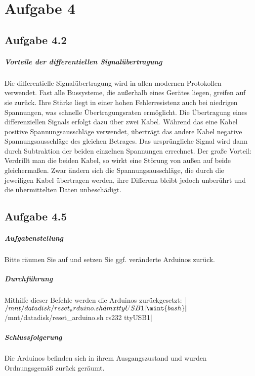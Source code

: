 \chapter{Aufgabe 4}
\section{Aufgabe 4.2}
\paragraph{Vorteile der differentiellen Signalübertragung}
Die differentielle Signalübertragung wird in allen modernen Protokollen verwendet. Fast alle Bussysteme, die außerhalb eines Gerätes liegen, greifen auf sie zurück. Ihre Stärke liegt in einer hohen Fehlerresistenz auch bei niedrigen Spannungen, was schnelle Übertragungsraten ermöglicht. Die Übertragung eines differenziellen Signals erfolgt dazu über zwei Kabel. Während das eine Kabel positive Spannungsausschläge verwendet, überträgt das andere Kabel negative Spannungsausschläge des gleichen Betrages. Das ursprüngliche Signal wird dann durch Subtraktion der beiden einzelnen Spannungen errechnet. Der große Vorteil: Verdrillt man die beiden Kabel, so wirkt eine Störung von außen auf beide gleichermaßen. Zwar ändern sich die Spannungsausschläge, die durch die jeweiligen Kabel übertragen werden, ihre Differenz bleibt jedoch unberührt und die übermittelten Daten unbeschädigt.




\section{Aufgabe 4.5}
\paragraph{Aufgabenstellung}
Bitte räumen Sie auf und setzen Sie ggf. veränderte Arduinos zurück.

\paragraph{Durchführung}
Mithilfe dieser Befehle werden die Arduinos zurückgesetzt:
|$ /mnt/datadisk/reset_arduino.sh dmx ttyUSB1|
\mint{bash}|$ /mnt/datadisk/reset_arduino.sh rs232 ttyUSB1|

\paragraph{Schlussfolgerung}
Die Arduinos befinden sich in ihrem Ausgangszustand und wurden Ordnungsgemäß zurück geräumt.